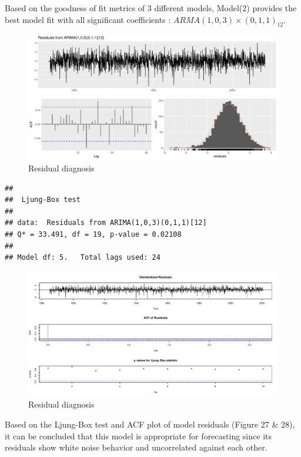 \documentclass[
  11pt,
]{article}
\begin{document}
Based on the goodness of fit metrics of 3 different models, Model(2)
provides the best model fit with all significant coefficients :
\(ARMA(1,0,3)\times(0,1,1)_{12}\).

\begin{figure}
\centering
\includegraphics{ST422_files/figure-latex/unnamed-chunk-37-1.pdf}
\caption{Residual diagnosis}
\end{figure}

\begin{verbatim}
## 
##  Ljung-Box test
## 
## data:  Residuals from ARIMA(1,0,3)(0,1,1)[12]
## Q* = 33.491, df = 19, p-value = 0.02108
## 
## Model df: 5.   Total lags used: 24
\end{verbatim}

\begin{figure}
\centering
\includegraphics{ST422_files/figure-latex/unnamed-chunk-37-2.pdf}
\caption{Residual diagnosis}
\end{figure}

Based on the Ljung-Box test and ACF plot of model residuals (Figure 27
\& 28), it can be concluded that this model is appropriate for
forecasting since its residuals show white noise behavior and
uncorrelated against each other.
\end{document}
